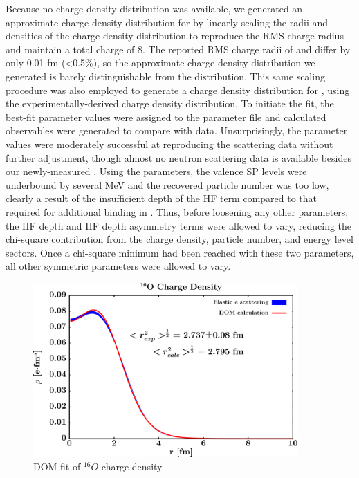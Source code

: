 Because no \oEight charge density distribution was available, we generated an approximate charge density
distribution for \oEight by linearly scaling
the radii and densities of the \oSix charge density distribution to reproduce the \oEight RMS charge
radius and maintain a total charge of 8. The reported RMS charge radii of \oSix and \oEight differ by only
0.01 fm (<0.5\%), so the approximate \oEight charge density distribution we generated is barely
distinguishable from the \oSix distribution. This same scaling procedure was also employed to
generate a charge density distribution for \snTwelve, using the
experimentally-derived \snFour charge density distribution. To initiate the fit, the \oSix best-fit parameter values
were assigned to the \oEight parameter file and calculated observables were generated to compare
with \oEight data. Unsurprisingly, the \oSix parameter values were moderately successful at reproducing
the \oEight scattering data without further adjustment, though almost no neutron scattering data is
available besides our newly-measured \tot. Using the \oSix parameters, the \oEight valence SP levels were underbound
by several MeV and the recovered particle number was too low, clearly a result of the insufficient
depth of the \oSix HF term compared to that required for additional binding in \oEight. Thus, before
loosening any other parameters, the HF depth and HF depth asymmetry terms were allowed to vary,
reducing the chi-square contribution from the charge density, particle number, and energy level
sectors. Once a chi-square minimum had been reached with these two parameters, all other symmetric parameters
were allowed to vary.

\begin{figure}
\begin{center}
\includegraphics[width = 0.9\textwidth]{figures/o16_chargeDensity.png}
\caption{DOM fit of $^{16}O$ charge density}
\label{o16ChargeDensity}
\end{center}
\end{figure}

